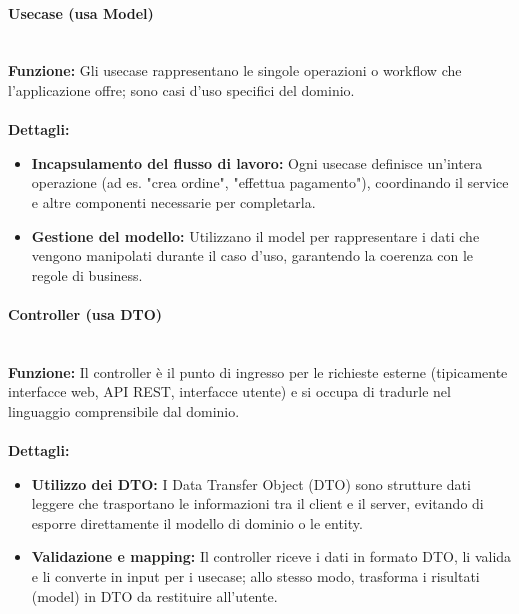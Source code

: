 \paragraph{Usecase (usa Model)}
\mbox{}\\
\textbf{Funzione:} Gli usecase rappresentano le singole operazioni o workflow che l’applicazione offre; sono casi d’uso specifici del dominio. \\
\mbox{}\\
\textbf{Dettagli:}
\begin{itemize}
  \item \textbf{Incapsulamento del flusso di lavoro:} Ogni usecase definisce un’intera operazione (ad es. "crea ordine", "effettua pagamento"), coordinando il service e altre componenti necessarie per completarla.
  \item \textbf{Gestione del modello:} Utilizzano il model per rappresentare i dati che vengono manipolati durante il caso d’uso, garantendo la coerenza con le regole di business.
\end{itemize}

\paragraph{Controller (usa DTO)}
\mbox{}\\
\textbf{Funzione:} Il controller è il punto di ingresso per le richieste esterne (tipicamente interfacce web, API REST, interfacce utente) e si occupa di tradurle nel linguaggio comprensibile dal dominio. \\
\mbox{}\\
\textbf{Dettagli:}
\begin{itemize}
  \item \textbf{Utilizzo dei DTO:} I Data Transfer Object (DTO) sono strutture dati leggere che trasportano le informazioni tra il client e il server, evitando di esporre direttamente il modello di dominio o le entity.
  \item \textbf{Validazione e mapping:} Il controller riceve i dati in formato DTO, li valida e li converte in input per i usecase; allo stesso modo, trasforma i risultati (model) in DTO da restituire all’utente.
\end{itemize}

